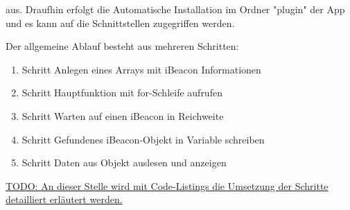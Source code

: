 aus. Draufhin erfolgt die Automatische Installation im Ordner "plugin" der App und es kann auf die Schnittstellen zugegriffen werden.

Der allgemeine Ablauf besteht aus mehreren Schritten:
\begin{enumerate}
\item Schritt Anlegen eines Arrays mit iBeacon Informationen
\item Schritt Hauptfunktion mit for-Schleife aufrufen
\item Schritt Warten auf einen iBeacon in Reichweite
\item Schritt Gefundenes iBeacon-Objekt in Variable schreiben
\item Schritt Daten aus Objekt auslesen und anzeigen
\end{enumerate}



\underline{TODO: An dieser Stelle wird mit Code-Listings die Umsetzung der Schritte }\\
\underline{detailliert erläutert werden.}
